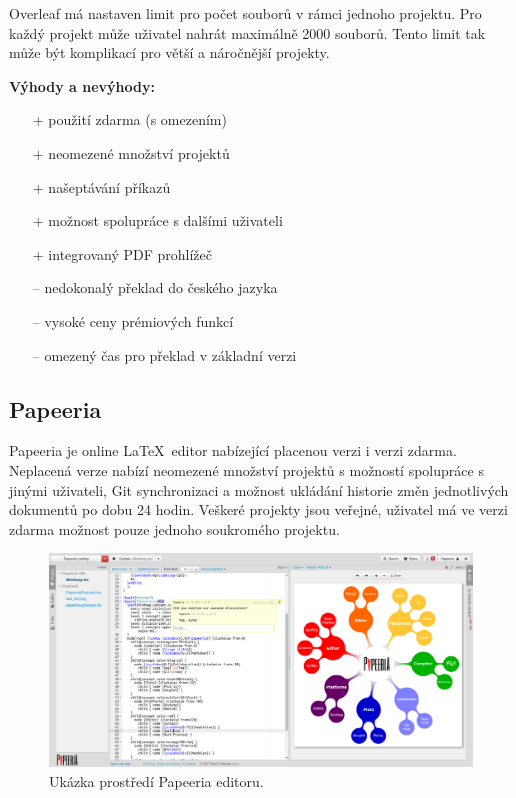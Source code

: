 Overleaf má nastaven limit pro počet souborů v rámci jednoho projektu. Pro každý projekt může uživatel nahrát maximálně 2000 souborů. Tento limit tak může být komplikací pro větší a náročnější projekty. \cite{Overleaflimity}

\textbf{Výhody a nevýhody:}
\begin{multicols}{2}
	\begin{itemize}
		\item [+] použití zdarma (s omezením)
		\item [+] neomezené množství projektů
		\item [+] našeptávání příkazů
		\item [+] možnost spolupráce s dalšími uživateli
		\item [+] integrovaný PDF prohlížeč
	\columnbreak
		\item [--] nedokonalý překlad do českého jazyka
		\item [--] vysoké ceny prémiových funkcí
		\item [--] omezený čas pro překlad v základní verzi
	\end{itemize}
\end{multicols}

\subsection{Papeeria}
Papeeria je online \LaTeX\ editor nabízející placenou verzi i verzi zdarma. Neplacená verze nabízí neomezené množství projektů s možností spolupráce s jinými uživateli, Git synchronizaci a možnost ukládání historie změn jednotlivých dokumentů po dobu 24 hodin. Veškeré projekty jsou veřejné, uživatel má ve verzi zdarma možnost pouze jednoho soukromého projektu. \cite{Papeeria}\cite{Papeeriafeatures}

\begin{figure}[h]
	\centering
	\includegraphics[width=\textwidth]{obrazky/papeeria.png}
	\caption[Ukázka prostředí Papeeria editoru.]{Ukázka prostředí Papeeria editoru. \cite{Papeeriaimg}}
	\label{fig:papeeria}
\end{figure}

